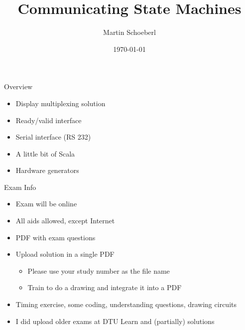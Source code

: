

\newif\ifbook


\title{Communicating State Machines}
\author{Martin Schoeberl}
\date{\today}



\begin{frame}
\titlepage
\end{frame}



\begin{frame}[fragile]{Overview}
\begin{itemize}
\item Display multiplexing solution
\item Ready/valid interface
\item Serial interface (RS 232)
\item A little bit of Scala
\item Hardware generators
\end{itemize}
\end{frame}

\begin{frame}[fragile]{Exam Info}
\begin{itemize}
\item Exam will be online
\item All aids allowed, except Internet
\item PDF with exam questions
\item Upload solution in a single PDF
\begin{itemize}
\item Please use your study number as the file name
\item Train to do a drawing and integrate it into a PDF
\end{itemize}
\item Timing exercise, some coding, understanding questions, drawing circuits
\item I did upload older exams at DTU Learn and (partially) solutions
\end{itemize}
\end{frame}


